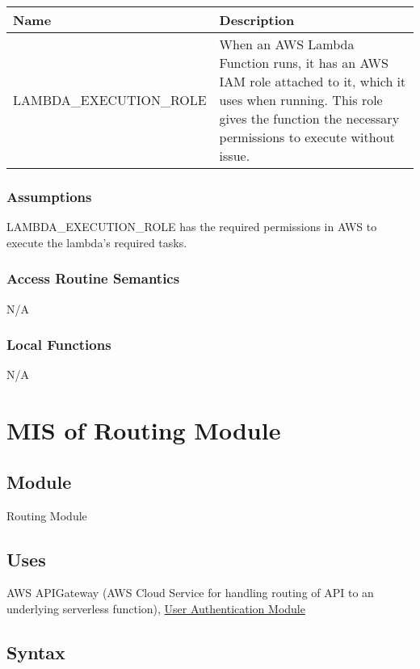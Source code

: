 \documentclass[12pt, titlepage]{article}
\begin{document}
{  \begin{center}
    \begin{tabular}{p{6cm} p{10cm}}
      \hline
      \textbf{Name} & \textbf{Description} \\
      \hline
      LAMBDA\_EXECUTION\_ROLE & When an AWS Lambda Function runs, it
      has an AWS IAM role attached to it, which it uses when running.
      This role gives the function the necessary permissions to execute
      without issue. \\
      \hline
    \end{tabular}
  \end{center}

  \subsubsection{Assumptions}

  LAMBDA\_EXECUTION\_ROLE has the required permissions in AWS to
  execute the lambda's required tasks.

  \subsubsection{Access Routine Semantics}

  N/A

  \subsubsection{Local Functions}

  N/A

  \section{MIS of Routing Module}
  \label{sec:RM}

  \subsection{Module}

  Routing Module

  \subsection{Uses}

  AWS APIGateway (AWS Cloud Service for handling routing of API to an
  underlying serverless function), \hyperref[sec:UA]{User Authentication Module}

  \subsection{Syntax}

}
\end{document}
